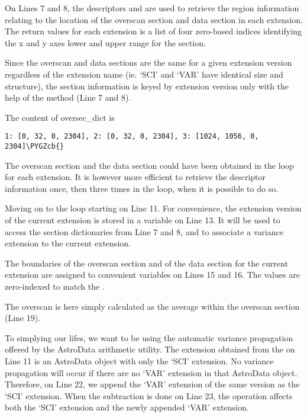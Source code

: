 \documentclass[letterpaper,10pt,english]{sphinxmanual}
\def\PYGZcb{\char`\}}
\begin{document}
On Lines 7 and 8, the descriptors  and 
are used to retrieve the region information relating to the location
of the overscan section and data section in each extension.  The return
values for each extension is a list of four zero-based indices identifying
the x and y axes lower and upper range for the section.

Since the overscan and data sections are the same for a given extension
version regardless of the extension name (ie. `SCI' and `VAR' have
identical size and structure), the section information is keyed by extension
version only with the help of the  method (Line 7
and 8).

The content of oversec\_dict is

\begin{Verbatim}[commandchars=\\\{\}]
1: [0, 32, 0, 2304], 2: [0, 32, 0, 2304], 3: [1024, 1056, 0, 2304]\PYGZcb{}
\end{Verbatim}

The overscan section and the data section could have been obtained in the
loop for each extension.  It is however more efficient to retrieve the
descriptor information once, then three times in the loop, when it is
possible to do so.

Moving on to the loop starting on Line 11.  For convenience, the extension
version of the current extension is stored in a variable on Line 13.  It
will be used to access the section dictionaries from Line 7 and 8, and to
associate a variance extension to the current extension.

The boundaries of the overscan section and of the data section for the
current extension are assigned to convenient variables on Lines 15 and 16.
The values are zero-indexed to match the .

The overscan is here simply calculated as the average within the overscan
section (Line 19).

To simplying our lifes, we want to be using the automatic variance propagation
offered by the AstroData arithmetic utility.  The extension obtained from the
 on Line 11 is an AstroData object with only the `SCI' extension.  No
variance propagation will occur if there are no `VAR' extension in that
AstroData object.  Therefore, on Line 22, we append the `VAR' extension of the
same version as the `SCI' extension.  When the subtraction is done on Line 23,
the operation affects both the `SCI' extension and the newly appended `VAR'
extension.
\end{document}
